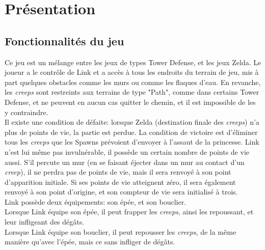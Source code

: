 \chapter{Présentation}

\section{Fonctionnalités du jeu}

Ce jeu est un mélange entre les jeux de types Tower Defense, et les jeux Zelda.
Le joueur a le contrôle de Link et a accès à tous les endroits du terrain de
jeu, mis à part quelques obstacles comme les murs ou comme les flaques d'eau.
En revanche, les \emph{creeps} sont restreints aux terrains de type
"Path", comme dans certains Tower Defense, et ne peuvent en aucun cas quitter le chemin, et il est
impossible de les y contraindre.\\
Il existe une condition de défaite: lorsque Zelda (destination finale des
\emph{creeps}) n'a plus de points de vie, la partie est perdue.
La condition de victoire est d'éliminer tous les \emph{creeps} que les Spawns
prévoient d'envoyer à l'assaut de la princesse.
Link n'est lui même pas invulnérable, il possède un certain nombre de points
de vie aussi. S'il percute un mur (en se faisant éjecter dans un mur au
contact d'un \emph{creep}), il ne perdra pas de points de vie, mais il sera
renvoyé à son point d'apparition initiale.
Si ses points de vie atteignent zéro, il sera également renvoyé à son point
d'origine, et son compteur de vie sera initialisé à trois.\\
Link possède deux équipements: son épée, et son bouclier.\\
Lorsque Link équipe son épée, il peut frapper les \emph{creeps}, ainsi les
repoussant, et leur infligeant des dégâts.\\
Lorsque Link équipe son bouclier, il peut repousser les \emph{creeps}, de la
même manière qu'avec l'épée, mais ce sans infliger de dégâts.\\